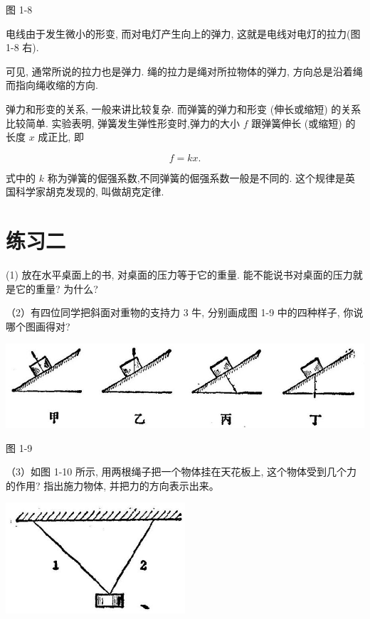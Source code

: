 \documentclass[10pt]{article}
\begin{document}
图 1-8

电线由于发生微小的形变, 而对电灯产生向上的弹力, 这就是电线对电灯的拉力(图 1-8 右).

可见, 通常所说的拉力也是弹力. 绳的拉力是绳对所拉物体的弹力, 方向总是沿着绳而指向绳收缩的方向.

弹力和形变的关系, 一般来讲比较复杂. 而弹簧的弹力和形变 (伸长或缩短) 的关系比较简单. 实验表明, 弹簧发生弹性形变时,弹力的大小 \(f\) 跟弹簧伸长 (或缩短) 的长度 \(x\) 成正比, 即

\[
f = {kx}\text{.}
\]

式中的 \(k\) 称为弹簧的倔强系数,不同弹簧的倔强系数一般是不同的. 这个规律是英国科学家胡克发现的, 叫做胡克定律.

\section*{练习二}

(1) 放在水平桌面上的书, 对桌面的压力等于它的重量. 能不能说书对桌面的压力就是它的重量? 为什么?

（2）有四位同学把斜面对重物的支持力 3 牛, 分别画成图 1-9 中的四种样子, 你说哪个图画得对?

\begin{center}
\includegraphics[max width=1.0\textwidth]{images/01912d55-147c-70aa-b0e0-1782a122f948_23_648673.jpg}
\end{center}

图 1-9

（3）如图 1-10 所示, 用两根绳子把一个物体挂在天花板上, 这个物体受到几个力的作用? 指出施力物体, 并把力的方向表示出来。

\begin{center}
\includegraphics[max width=0.5\textwidth]{images/01912d55-147c-70aa-b0e0-1782a122f948_24_372526.jpg}
\end{center}
\end{document}
